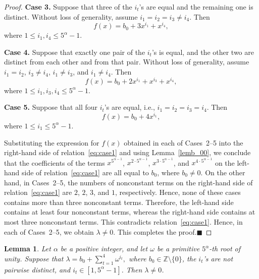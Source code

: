 \documentclass[12pt]{article}
\newtheorem{lemA}[propA]{Lemma}
\begin{document}
\begin{proof}
   	\medskip
   	
   	\textbf{Case 3.}
   	Suppose that three of the $i_t$'s are equal and the remaining one is distinct. Without loss of generality, assume $i_1=i_2=i_3\neq i_4$. Then
   	\[
   	f(x)=b_0+3x^{i_1}+x^{i_4},
   	\]
   	where $1\le i_1,i_4\le 5^\alpha-1$.
   	
   	\medskip
   	
   	\textbf{Case 4.}
   	Suppose that exactly one pair of the $i_t$'s is equal, and the other two are distinct from each other and from that pair. Without loss of generality, assume $i_1=i_2$, $i_3\neq i_4$, $i_1\neq i_3$, and $i_1\neq i_4$. Then
   	\[
   	f(x)=b_0+2x^{i_1}+x^{i_3}+x^{i_4},
   	\]
   	where $1\le i_1,i_3,i_4\le 5^\alpha-1$.
   	
   	\medskip
   	
   	\textbf{Case 5.}
   	Suppose that all four $i_t$'s are equal, i.e., $i_1=i_2=i_3=i_4$. Then
   	\[
   	f(x)=b_0+4x^{i_1},
   	\]
   	where $1\le i_1\le 5^\alpha-1$.
   	
  \noindent Substituting the expression for $f(x)$ obtained in each of Cases~2--5 into the right-hand side of relation~\eqref{eq:case1} and using Lemma~\ref{lemb_00}, we conclude that the coefficients of the terms
   	$x^{5^{\alpha-1}}$, $x^{2\cdot5^{\alpha-1}}$, $x^{3\cdot5^{\alpha-1}}$, and $x^{4\cdot5^{\alpha-1}}$
   	on the left-hand side of relation~\eqref{eq:case1} are all equal to $b_0$, where $b_0\neq0$. On the other hand, in Cases~2--5, the numbers of nonconstant terms on the right-hand side of relation~\eqref{eq:case1} are $2$, $2$, $3$, and $1$, respectively. Hence, none of these cases contains more than three nonconstant terms. Therefore, the left-hand side contains at least four nonconstant terms, whereas the right-hand side contains at most three nonconstant terms. This contradicts relation~\eqref{eq:case1}. Hence, in each of Cases~2--5, we obtain $\lambda\neq0$. This completes the proof.\hfill$\blacksquare$
   \end{proof}
  \begin{lemA}\label{lemb_6}
  	Let $\alpha$ be a positive integer, and let $\omega$ be a primitive $5^\alpha$-th root of unity. Suppose that
  	$
  	\lambda=b_0+\sum_{t=1}^{4}\omega^{i_t},
  	$
  	where $b_0\in\mathbb{Z}\setminus\{0\}$, the $i_t$'s are not pairwise distinct, and $i_t\in[1,5^\alpha-1]$. Then $\lambda\neq0$.
  \end{lemA}
\end{document}
